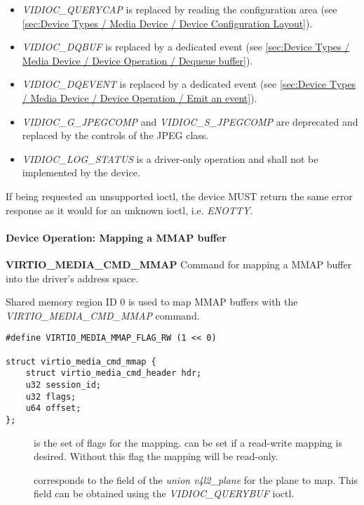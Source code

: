 \begin{itemize}
\item \textit{VIDIOC_QUERYCAP} is replaced by reading the configuration area
(see \ref{sec:Device Types / Media Device / Device Configuration Layout}).
\item \textit{VIDIOC_DQBUF} is replaced by a dedicated event
(see \ref{sec:Device Types / Media Device / Device Operation / Dequeue buffer}).
\item \textit{VIDIOC_DQEVENT} is replaced by a dedicated event
(see \ref{sec:Device Types / Media Device / Device Operation / Emit an event}).
\item \textit{VIDIOC_G_JPEGCOMP} and \textit{VIDIOC_S_JPEGCOMP} are deprecated
and replaced by the controls of the JPEG class.
\item \textit{VIDIOC_LOG_STATUS} is a driver-only operation and shall not be
implemented by the device.
\end{itemize}


If being requested an unsupported ioctl, the device MUST return the same
error response as it would for an unknown ioctl, i.e. \textit{ENOTTY}.

\paragraph{Device Operation: Mapping a MMAP buffer}

\textbf{VIRTIO_MEDIA_CMD_MMAP} Command for mapping a MMAP buffer into the
driver's address space.

Shared memory region ID 0 is used to map MMAP buffers with
the \textit{VIRTIO_MEDIA_CMD_MMAP} command.

\begin{lstlisting}
#define VIRTIO_MEDIA_MMAP_FLAG_RW (1 << 0)

struct virtio_media_cmd_mmap {
	struct virtio_media_cmd_header hdr;
	u32 session_id;
	u32 flags;
	u64 offset;
};
\end{lstlisting}

\begin{description}
\item[] is the set of flags for the mapping. 
can be set if a read-write mapping is desired. Without this flag the mapping
will be read-only.
\item[] corresponds to the  field of the
\textit{union v4l2_plane} for the plane to map. This field can be obtained
using the \textit{VIDIOC_QUERYBUF} ioctl.
\end{description}

